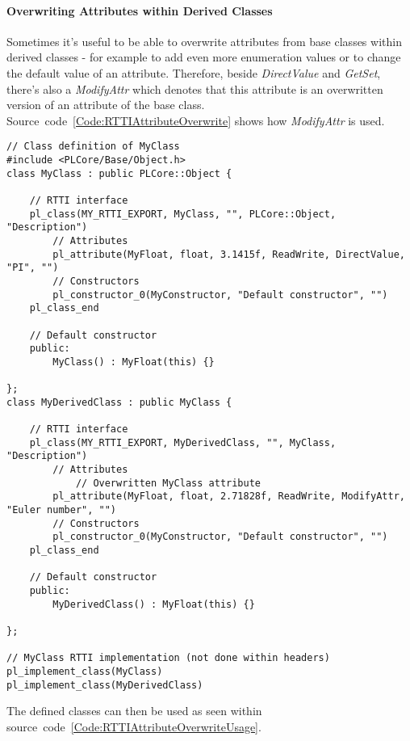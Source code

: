 \paragraph{Overwriting Attributes within Derived Classes}
Sometimes it's useful to be able to overwrite attributes from base classes within derived classes - for example to add even more enumeration values or to change the default value of an attribute. Therefore, beside \emph{DirectValue} and \emph{GetSet}, there's also a \emph{ModifyAttr} which denotes that this attribute is an overwritten version of an attribute of the base class. Source~code~\ref{Code:RTTIAttributeOverwrite} shows how \emph{ModifyAttr} is used.
\begin{lstlisting}[label=Code:RTTIAttributeOverwrite,caption={Overwriting \ac{RTTI} attributes in derived classes}]
// Class definition of MyClass
#include <PLCore/Base/Object.h>
class MyClass : public PLCore::Object {

	// RTTI interface
	pl_class(MY_RTTI_EXPORT, MyClass, "", PLCore::Object, "Description")
		// Attributes
		pl_attribute(MyFloat, float, 3.1415f, ReadWrite, DirectValue, "PI", "")
		// Constructors
		pl_constructor_0(MyConstructor, "Default constructor", "")
	pl_class_end

	// Default constructor
	public:
		MyClass() : MyFloat(this) {}

};
class MyDerivedClass : public MyClass {

	// RTTI interface
	pl_class(MY_RTTI_EXPORT, MyDerivedClass, "", MyClass, "Description")
		// Attributes
			// Overwritten MyClass attribute
		pl_attribute(MyFloat, float, 2.71828f, ReadWrite, ModifyAttr, "Euler number", "")
		// Constructors
		pl_constructor_0(MyConstructor, "Default constructor", "")
	pl_class_end

	// Default constructor
	public:
		MyDerivedClass() : MyFloat(this) {}

};

// MyClass RTTI implementation (not done within headers)
pl_implement_class(MyClass)
pl_implement_class(MyDerivedClass)
\end{lstlisting}
The defined classes can then be used as seen within source~code~\ref{Code:RTTIAttributeOverwriteUsage}.
